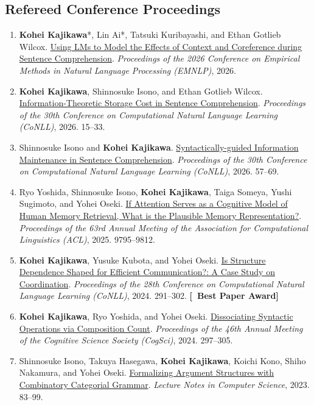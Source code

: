 \documentclass[10pt,a4paper]{article}
\begin{document}
\subsection*{Refereed Conference Proceedings}
\begin{enumerate}
    \item \textbf{Kohei Kajikawa}*, Lin Ai*, Tatsuki Kuribayashi, and Ethan Gotlieb Wilcox. \href{https://arxiv.org/abs/2609.32119}{Using LMs to Model the Effects of Context and Coreference during Sentence Comprehension}. \textit{Proceedings of the 2026 Conference on Empirical Methods in Natural Language Processing (EMNLP)}, 2026.
    \item \textbf{Kohei Kajikawa}, Shinnosuke Isono, and Ethan Gotlieb Wilcox. \href{https://aclanthology.org/2026.conll-main.2/}{Information-Theoretic Storage Cost in Sentence Comprehension}. \textit{Proceedings of the 30th Conference on Computational Natural Language Learning (CoNLL)}, 2026. 15--33.
    \item Shinnosuke Isono and \textbf{Kohei Kajikawa}. \href{https://aclanthology.org/2026.conll-main.5/}{Syntactically-guided Information Maintenance in Sentence Comprehension}. \textit{Proceedings of the 30th Conference on Computational Natural Language Learning (CoNLL)}, 2026. 57--69.
    \item Ryo Yoshida, Shinnosuke Isono, \textbf{Kohei Kajikawa}, Taiga Someya, Yushi Sugimoto, and Yohei Oseki. \href{https://aclanthology.org/2025.acl-long.483/}{If Attention Serves as a Cognitive Model of Human Memory Retrieval, What is the Plausible Memory Representation?}. \textit{Proceedings of the 63rd Annual Meeting of the Association for Computational Linguistics (ACL)}, 2025. 9795--9812.
    \item \textbf{Kohei Kajikawa}, Yusuke Kubota, and Yohei Oseki. \href{https://aclanthology.org/2024.conll-1.23/}{Is Structure Dependence Shaped for Efficient Communication?: A Case Study on Coordination}. \textit{Proceedings of the 28th Conference on Computational Natural Language Learning (CoNLL)}, 2024. 291--302. \textbf{[\faAward\ Best Paper Award]}
    \item \textbf{Kohei Kajikawa}, Ryo Yoshida, and Yohei Oseki. \href{https://escholarship.org/uc/item/2bp2m26p}{Dissociating Syntactic Operations via Composition Count}. \textit{Proceedings of the 46th Annual Meeting of the Cognitive Science Society (CogSci)}, 2024. 297--305.
    \item Shinnosuke Isono, Takuya Hasegawa, \textbf{Kohei Kajikawa}, Koichi Kono, Shiho Nakamura, and Yohei Oseki. \href{https://link.springer.com/chapter/10.1007/978-3-031-43977-3_6}{Formalizing Argument Structures with Combinatory Categorial Grammar}. \textit{Lecture Notes in Computer Science}, 2023. 83--99.
\end{enumerate}
\end{document}
